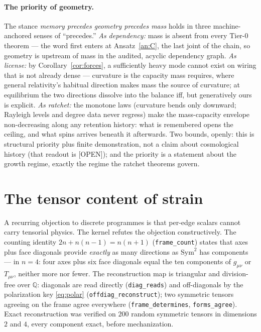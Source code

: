 \documentclass[10pt,twocolumn]{article}
\theoremstyle{definition}
\newcommand{\Open}{\textsf{[OPEN]}}
\newcommand{\code}[1]{\texttt{#1}}
\begin{document}
\paragraph{The priority of geometry.} The stance \emph{memory precedes geometry
precedes mass} holds in three machine-anchored senses of ``precedes.''
\emph{As dependency:} mass is absent from every Tier-0 theorem --- the word first
enters at Ansatz~\ref{an:C}, the last joint of the chain, so geometry is upstream of
mass in the audited, acyclic dependency graph. \emph{As license:} by
Corollary~\ref{cor:forces}, a sufficiently heavy mode cannot exist on wiring that is
not already dense --- curvature is the capacity mass requires, where general
relativity's habitual direction makes mass the source of curvature; at equilibrium
the two directions dissolve into the balance iff, but generatively ours is explicit.
\emph{As ratchet:} the monotone laws (curvature bends only downward; Rayleigh levels
and degree data never regress) make the mass-capacity envelope non-decreasing along
any retention history: what is remembered opens the ceiling, and what spins arrives
beneath it afterwards. Two bounds, openly: this is structural priority plus finite
demonstration, not a claim about cosmological history (that readout is \Open{});
and the priority is a statement about the growth regime, exactly the regime the
ratchet theorems govern.

\section{The tensor content of strain}\label{sec:tensor}

A recurring objection to discrete programmes is that per-edge scalars cannot carry
tensorial physics. The kernel refutes the objection constructively. The counting
identity $2n + n(n-1) = n(n+1)$ (\code{frame\_count}) states that axes plus face
diagonals provide \emph{exactly} as many directions as $\mathrm{Sym}^2$ has
components --- in $n=4$: four axes plus six face diagonals equal the ten components of
$g_{\mu\nu}$ or $T_{\mu\nu}$, neither more nor fewer. The reconstruction map is
triangular and division-free over $\mathbb{Q}$: diagonals are read directly
(\code{diag\_reads}) and off-diagonals by the polarization key \eqref{eq:polar}
(\code{offdiag\_reconstruct}); two symmetric tensors agreeing on the frame agree
everywhere (\code{frame\_determines}, \code{forms\_agree}). Exact reconstruction was
verified on $200$ random symmetric tensors in dimensions $2$ and $4$, every component
exact, before mechanization.
\end{document}
